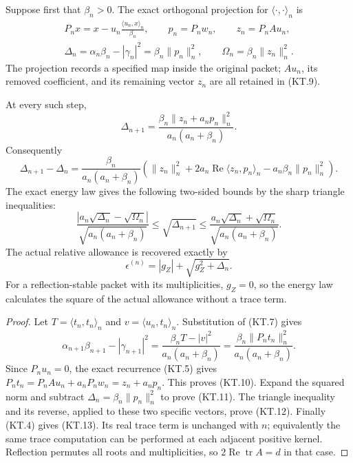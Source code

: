 Suppose first that \(\beta_n>0\).  The exact orthogonal projection
for \(\langle\cdot,\cdot\rangle_n\) is
\[
 \begin{gathered}
 P_nx=x-u_n\frac{\langle u_n,x\rangle_n}{\beta_n},\qquad
 p_n=P_nw_n,\qquad z_n=P_nAu_n,\\
 \Delta_n=\alpha_n\beta_n-|\gamma_n|^2
                =\beta_n\|p_n\|_n^2,
 \qquad \Omega_n=\beta_n\|z_n\|_n^2.
 \end{gathered}                                         \tag{KT.9}
\]
The projection records a specified map inside the original packet;
\(Au_n\), its removed coefficient, and its remaining vector
\(z_n\) are all retained in (KT.9).

\begin{theorem}
At every such step,
\[
 \boxed{\Delta_{n+1}
    =\frac{\beta_n\|z_n+a_np_n\|_n^2}
                          {a_n(a_n+\beta_n)}.}          \tag{KT.10}
\]
Consequently
\[
 \boxed{\Delta_{n+1}-\Delta_n
  =\frac{\beta_n}{a_n(a_n+\beta_n)}
       \left(\|z_n\|_n^2
        +2a_n\operatorname{Re}\langle z_n,p_n\rangle_n
        -a_n\beta_n\|p_n\|_n^2\right).}                \tag{KT.11}
\]
The exact energy law gives the following two-sided bounds by
the sharp triangle inequalities:
\[
 \frac{|a_n\sqrt{\Delta_n}-\sqrt{\Omega_n}|}
             {\sqrt{a_n(a_n+\beta_n)}}
 \leq\sqrt{\Delta_{n+1}}
 \leq\frac{a_n\sqrt{\Delta_n}+\sqrt{\Omega_n}}
             {\sqrt{a_n(a_n+\beta_n)}}.                 \tag{KT.12}
\]
The actual relative allowance is recovered exactly by
\[
 \boxed{\epsilon^{(n)}=|g_Z|+\sqrt{g_Z^2+\Delta_n}.}      \tag{KT.13}
\]
For a reflection-stable packet with its multiplicities,
\(g_Z=0\), so the energy law calculates the square of the actual
allowance without a trace term.
\end{theorem}

\begin{proof}
Let \(T=\langle t_n,t_n\rangle_n\) and
\(v=\langle u_n,t_n\rangle_n\).  Substitution of (KT.7) gives
\[
 \alpha_{n+1}\beta_{n+1}-|\gamma_{n+1}|^2
       =\frac{\beta_n T-|v|^2}{a_n(a_n+\beta_n)}
       =\frac{\beta_n\|P_nt_n\|_n^2}{a_n(a_n+\beta_n)}.
\]
Since \(P_nu_n=0\), the exact recurrence (KT.5) gives
\(P_nt_n=P_nAu_n+a_nP_nw_n=z_n+a_np_n\).
This proves (KT.10).  Expand the squared norm and subtract
\(\Delta_n=\beta_n\|p_n\|_n^2\) to prove (KT.11).
The triangle inequality and its reverse, applied to these two
specific vectors, prove (KT.12).  Finally (KT.4) gives
(KT.13).  Its real trace term is unchanged with \(n\); equivalently
the same trace computation can be performed at each adjacent
positive kernel.  Reflection permutes all roots and multiplicities,
so \(2\operatorname{Re}\operatorname{tr}A=d\) in that case.
\end{proof}

